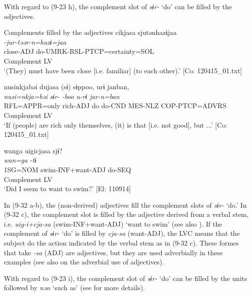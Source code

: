 With regard to (9-23 h), the complement slot of \textit{sɨr-} ‘do’ can be filled by the adjectives.

\ea   Complements filled by the adjectives \label{ex:9.32}
\ea %
 \gllll  cikjasa  sjutənhazɨjaa\\
      \textit{}  \textit{-jur-təər-n=hazɨ=jaa}\\
      close-ADJ  do-UMRK-RSL-PTCP=certainty=SOL\\
      Complement  LV\\
      \glt       ‘(They) must have been close [i.e. familiar] (to each other).’ [Co: 120415\_01.txt]

\ex \label{ex:9.32b} %
    \gllll  nusinkjabəi  dujasa  (sɨ)  sɨppoo,  urɨ  janban,\\
      \textit{nusi=nkja=bəi}  \textit{}  \textit{sɨr-}  \textit{-boo  u-rɨ  jar-n=ban}\\
      RFL=APPR=only  rich-ADJ  do  do-CND  MES-NLZ  COP-PTCP=ADVRS\\
        Complement    LV    \\
      \glt       ‘If (people) are rich only themselves, (it) is that [i.e. not good], but ...’ [Co: 120415\_01.txt]

\ex \label{ex:9.32c} %
    \gllll  wanga  uigicjasa  sjɨ?\\
      \textit{wan=ga}  \textit{}  \textit{-tɨ}\\
      1SG=NOM  swim-INF+want-ADJ  do-SEQ\\
        Complement  LV\\
      \glt       ‘Did I seem to want to swim?’ [El: 110914]
    \z
\z

In (9-32 a-b), the (non-derived) adjectives fill the complement slots of \textit{sɨr-} ‘do.’ In (9-32 c), the complement slot is filled by the adjective derived from a verbal stem, i.e. \textit{uig-i+cja-sa} (swim-INF+want-ADJ) ‘want to swim’ (see also ). If the complement of \textit{sɨr-} ‘do’ is filled by \textit{cja-sa} (want-ADJ), the LVC means that the subject  do the action indicated by the verbal stem as in (9-32 c). These formes that take \textit{{}-sa} (ADJ) are adjectives, but they are used adverbially in these examples (see also  on the adverbial use of adjectives).

With regard to (9-23 i), the complement slot of \textit{sɨr-} ‘do’ can be filled by the units followed by \textit{nən} ‘such as’ (see  for more details).

